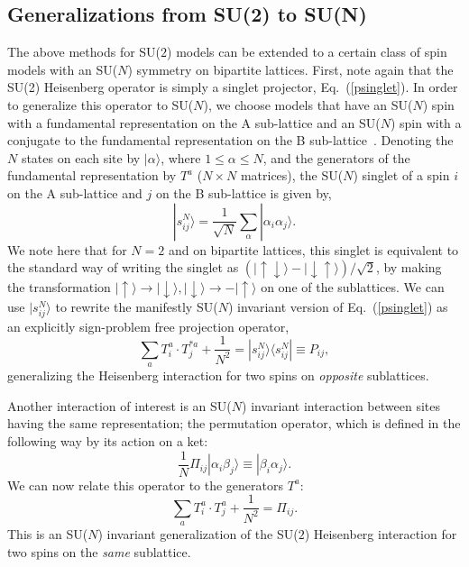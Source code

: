 \documentclass[10pt,pre,aps,twocolumn,showpacs,superscriptaddress,floatfix]{revtex4-1}
\begin{document}
\subsection {Generalizations from SU(2) to SU(N)}
\label{ss:su2N}

The above methods for SU($2$) models can be extended to a certain class of spin models with an SU($N$) symmetry on bipartite lattices. First, note again 
that the SU(2) Heisenberg operator is simply a singlet projector, Eq.~(\ref{psinglet}). In order to generalize this operator to SU($N$), we choose models 
that have an SU($N$) spin with a fundamental representation on the A sub-lattice and an SU($N$) spin with a conjugate to the fundamental representation 
on the B sub-lattice~\cite{affleck1985:lgN,Read89}. Denoting the $N$ states on each site by $|\alpha\rangle$, where $1\leq \alpha \leq N$, 
and the generators of the fundamental representation by $T^a$ ($N\times N$ matrices), the SU($N$) singlet of a spin $i$ on the A sub-lattice and $j$ 
on the B sub-lattice is given by, 
\begin{equation}
|s^N_{ij}\rangle = \frac{1}{\sqrt{N}}\sum_\alpha |\alpha_i\alpha_j\rangle. 
\end{equation}
We note here that for $N=2$ and on bipartite lattices, this singlet is equivalent to the standard way of writing the singlet as 
$(|\uparrow \downarrow\rangle -|\downarrow \uparrow\rangle)/\sqrt{2}$, by making the transformation $|\uparrow \rangle\rightarrow |\downarrow\rangle, |\downarrow \rangle\rightarrow -|\uparrow\rangle$ on one of the sublattices. We can use  $|s^N_{ij}\rangle$ to rewrite the manifestly SU($N$) invariant version of Eq.~(\ref{psinglet}) as an explicitly sign-problem 
free projection operator,
\begin{equation}
\sum_a T^a_i \cdot
T^{*a}_j + \frac{1}{N^2} = |s^N_{ij}\rangle \langle s^N_{ij}|\equiv P_{ij},
\end{equation}
generalizing the Heisenberg interaction for two spins on {\em opposite} sublattices. 

Another interaction of interest is an SU($N$) invariant interaction between sites having the same representation; the permutation operator, 
which is defined in the following way by its action on a ket:
\begin{equation}
\frac{1}{N}\Pi_{ij}|\alpha_i\beta_j\rangle \equiv |\beta_i\alpha_j\rangle. 
\label{pija}
\end{equation}
We can now relate this operator to the generators $T^a$:
\begin{equation}
\sum_a T^a_i \cdot
T^{a}_j +\frac{1}{N^2} =\Pi_{ij}.
\label{pijb}
\end{equation}
This is an SU($N$) invariant generalization of the SU($2$) Heisenberg interaction for two spins on the {\em same} sublattice.
\end{document}
